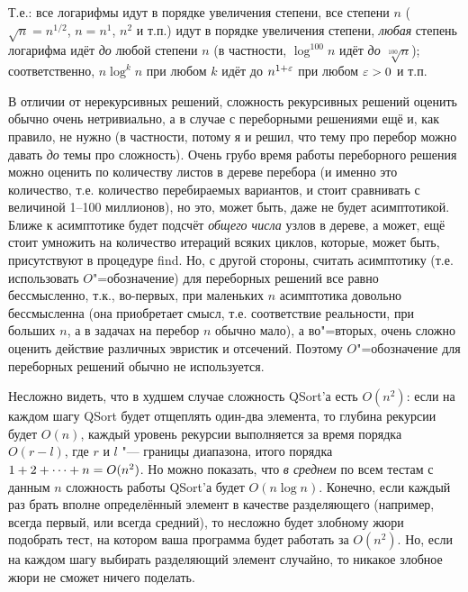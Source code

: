 \documentclass[a4paper,10pt]{problems}
\begin{document}
Т.е.: все логарифмы идут в порядке увеличения степени, все степени $n$ 
($\sqrt n=n^{1/2}$, $n=n^1$, $n^2$ и т.п.) идут в порядке увеличения степени, 
\textit{любая} степень логарифма идёт \textit{до} любой степени $n$ (в 
частности, $\log^{100} n$ идёт \textit{до} $\sqrt[100] n$);  
соответственно, $n\log^k n$ при любом $k$ идёт до $n^{1+\varepsilon}$ при любом 
$\varepsilon>0$ и т.п.

 В отличии от нерекурсивных решений, сложность 
рекурсивных решений оценить обычно очень нетривиально, а в случае с переборными 
решениями ещё и, как правило, не нужно (в частности, потому я и 
решил, что тему про перебор можно давать \textit{до} темы про сложность). Очень 
грубо время работы переборного решения можно оценить по количеству листов в дереве перебора (и 
именно это количество, т.е. количество перебираемых вариантов, и стоит 
сравнивать с величиной 1--100 миллионов), но это, 
может быть, даже не будет асимптотикой. Ближе к асимптотике будет подсчёт 
\textit{общего числа} узлов в дереве, а может, ещё стоит умножить на количество 
итераций всяких циклов, которые, может быть, присутствуют в процедуре find. Но, 
с другой стороны, считать асимптотику (т.е. использовать $O$"=обозначение) для 
переборных решений все равно бессмысленно, т.к., во-первых, при маленьких $n$ 
асимптотика довольно бессмысленна (она приобретает смысл, т.е. соответствие 
реальности, при больших $n$, а в задачах на перебор $n$ обычно мало), а 
во"=вторых, очень сложно оценить действие различных эвристик и отсечений. 
Поэтому $O$"=обозначение для переборных решений обычно не используется. 


 Несложно видеть, что в худшем случае сложность 
QSort'а есть $O(n^2)$: если на каждом шагу QSort будет отщеплять один-два 
элемента, то глубина рекурсии будет $O(n)$, каждый уровень рекурсии выполняется 
за время порядка $O(r-l)$, где $r$ и $l$ "--- границы диапазона, итого порядка 
$1+2+\dots+n\hm=O(n^2)$. Но можно показать, что \textit{в среднем} по всем 
тестам с данным $n$  сложность работы QSort'а будет $O(n \log n)$. Конечно, 
если каждый раз брать вполне определённый элемент в качестве разделяющего 
(например, всегда первый, или всегда средний), то несложно будет злобному жюри 
подобрать тест, на котором ваша программа будет работать за $O(n^2)$. Но, 
если на каждом шагу выбирать разделяющий элемент случайно, то никакое злобное 
жюри не сможет ничего поделать.
\end{document}
